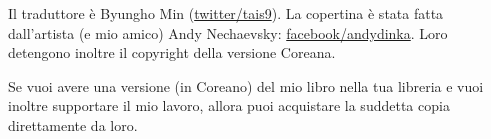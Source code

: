 Il traduttore è Byungho Min (\href{http://go.yurichev.com/17344}{twitter/tais9}).
La copertina è stata fatta dall'artista (e mio amico) Andy Nechaevsky:
\href{http://go.yurichev.com/17023}{facebook/andydinka}.
Loro detengono inoltre il copyright della versione Coreana.

Se vuoi avere una versione  (in Coreano) del mio libro nella tua libreria e 
vuoi inoltre supportare il mio lavoro, allora puoi acquistare la suddetta copia direttamente da loro.
